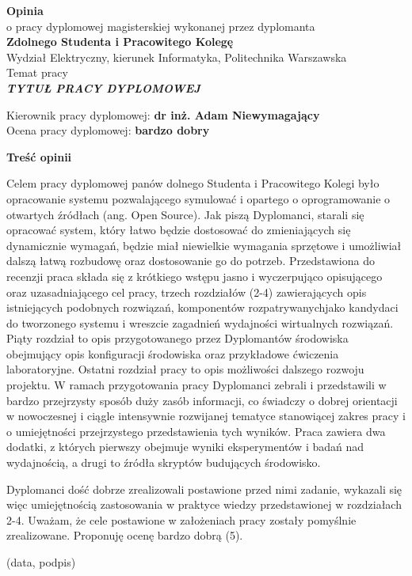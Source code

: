 \newpage
\begin{center}
 {\large\bf  Opinia} \\
o pracy dyplomowej magisterskiej wykonanej przez dyplomanta\\
{\bf Zdolnego Studenta i Pracowitego Kolegę} \\
 Wydział Elektryczny, kierunek Informatyka,  Politechnika Warszawska\\
Temat pracy\\
\textit{\bf
TYTUŁ PRACY DYPLOMOWEJ
}\\
\end{center}
\medskip
\noindent
Kierownik pracy dyplomowej: {\bf dr inż. Adam Niewymagający}\\
Ocena pracy dyplomowej: {\bf bardzo dobry}

\medskip

\centerline{\bf Treść opinii}
   Celem pracy dyplomowej panów dolnego Studenta i Pracowitego Kolegi  było
opracowanie systemu pozwalającego symulować  i opartego o oprogramowanie o
otwartych źródłach (ang. Open Source). Jak piszą Dyplomanci, starali się opracować
system, który łatwo będzie dostosować do zmieniających się dynamicznie wymagań,
będzie miał niewielkie wymagania sprzętowe i umożliwiał dalszą łatwą rozbudowę oraz
dostosowanie go do potrzeb.
Przedstawiona do recenzji praca składa się z krótkiego wstępu jasno i
wyczerpująco opisującego oraz uzasadniającego cel pracy, trzech rozdziałów (2-4)
zawierających opis istniejących podobnych
rozwiązań, komponentów rozpatrywanychjako kandydaci do
tworzonego systemu i wreszcie zagadnień wydajności wirtualnych
rozwiązań. Piąty rozdział to opis przygotowanego przez
Dyplomantów środowiska obejmujący opis konfiguracji
środowiska oraz przykładowe ćwiczenia laboratoryjne. Ostatni
rozdział pracy to opis możliwości dalszego
rozwoju projektu. W ramach przygotowania pracy Dyplomanci zebrali i przedstawili w
bardzo przejrzysty sposób duży zasób informacji, co świadczy o dobrej orientacji
w nowoczesnej i ciągle intensywnie rozwijanej tematyce stanowiącej
zakres pracy i o umiejętności przejrzystego przedstawienia tych
wyników. Praca zawiera dwa dodatki, z których pierwszy obejmuje wyniki
eksperymentów i badań nad wydajnością, a drugi to źródła
skryptów budujących środowisko.

 Dyplomanci dość
dobrze zrealizowali postawione przed nimi zadanie,
wykazali się więc umiejętnością zastosowania w praktyce wiedzy
przedstawionej w rozdziałach 2-4.  Uważam, że cele postawione w założeniach pracy zostały pomyślnie
zrealizowane. Proponuję ocenę bardzo dobrą (5).

\vskip 1cm
{
\raggedleft
(data, podpis)\kern1cm

}